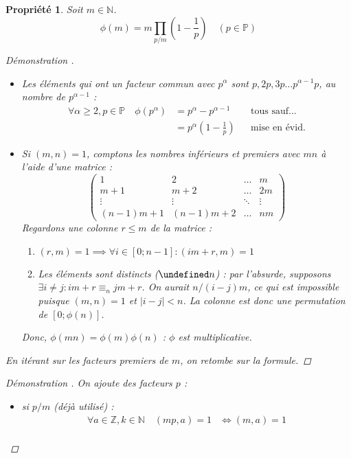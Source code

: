 \documentclass[11pt,twocolumn]{article}
\let\mod\undefined
\DeclareMathOperator{\mod}{mod}
\theoremstyle{plain}
\newtheorem{pr}{Propriété}
\newcommand{\esP}{\mathbb{P}} %
\newcommand{\esN}{\mathbb{N}} %
\newcommand{\esZ}{\mathbb{Z}} %
\newcommand{\dbi}{\Longleftrightarrow}
\newenvironment{cproof}[1]{\begin{proof}[Démonstration \cite{#1}]}{\end{proof}}
\begin{document}
\begin{pr}
	Soit $m \in \esN$. \[
		\phi(m) = m \left.\prod_{p/m} \left(1 - \frac1p\right)\right.
		\quad (p \in \esP)
	\]
	\begin{cproof}{Buys} ~
		\begin{itemize}
			\item Les éléments qui ont un facteur commun avec $p^\alpha$ sont
				$p, 2p, 3p \dots p^{\alpha-1}p$, au nombre de $p^{\alpha-1}$ :
				\begin{align*}
					\forall \alpha \geq 2, p \in \esP \quad
					\phi\left(p^\alpha\right) &= p^\alpha - p^{\alpha-1}
						&& \text{tous sauf...} \\
					&= p^\alpha\left(1-\frac1p\right)
						&& \text{mise en évid.}
				\end{align*}
			\item Si $(m,n)=1$, comptons les nombres
				inférieurs et premiers avec $mn$ à l'aide d'une matrice : \[
					\left(\begin{array}{llll}
						1 & 2 & \dots & m \\
						m+1 & m+2 & \dots & 2m \\
						\vdots & \vdots & \ddots & \vdots \\
						(n-1)m+1 & (n-1)m+2 & \dots & nm
					\end{array}\right)
				\]
				Regardons une colonne $r \leq m$ de la matrice :
				\begin{enumerate}
					\item $(r,m)=1 \implies \forall i \in [0;n-1] : (im+r,m)=1$
					\item Les éléments sont distincts ($\mod n$) :
						par l'absurde,
						supposons $\exists i \neq j : im+r \equiv_n jm+r$.
						On aurait $n/\left(i-j\right)m$, ce qui est impossible
						puisque $(m,n)=1$ et $\left|i-j\right|<n$.
						La colonne est donc une permutation de $[0;\phi(n)]$.
				\end{enumerate}
				Donc, $\phi(mn)=\phi(m)\phi(n)$ : $\phi$ est multiplicative.
		\end{itemize}
		En itérant sur les facteurs premiers de $m$, on retombe sur la formule.
	\end{cproof}
	\begin{cproof}{Buys}
		On ajoute des facteurs $p$ :
		\begin{itemize}
			\item si $p/m$ (déjà utilisé) :
				\begin{align*}
					\forall a \in \esZ, k \in \esN \quad (mp,a)=1
					&\dbi (m,a)=1 \\

\end{align*}
\end{itemize}
\end{cproof}
\end{pr}
\end{document}
